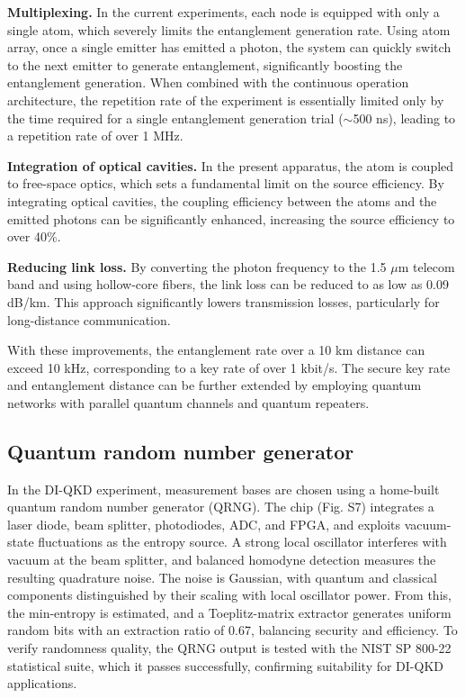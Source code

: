 \documentclass[aps,reprint,showpacs,superscriptaddress]{revtex4-2}
\begin{document}
\textbf{Multiplexing.} In the current experiments, each node is equipped with only a single atom, which severely limits the entanglement generation rate. Using atom array, once a single emitter has emitted a photon, the system can quickly switch to the next emitter to generate entanglement, significantly boosting the entanglement generation. When combined with the continuous operation architecture, the repetition rate of the experiment is essentially limited only by the time required for a single entanglement generation trial ($\sim$500 ns), leading to a repetition rate of over 1 MHz.

\textbf{Integration of optical cavities.} In the present apparatus, the atom is coupled to free-space optics, which sets a fundamental limit on the source efficiency. By integrating optical cavities, the coupling efficiency between the atoms and the emitted photons can be significantly enhanced, increasing the source efficiency to over 40\%.

\textbf{Reducing link loss.} By converting the photon frequency to the 1.5 $\mu$m telecom band and using hollow-core fibers, the link loss can be reduced to as low as 0.09 dB/km. This approach significantly lowers transmission losses, particularly for long-distance communication.

With these improvements, the entanglement rate over a 10 km distance can exceed 10 kHz, corresponding to a key rate of over 1 kbit/s. The secure key rate and entanglement distance can be further extended by employing quantum networks with parallel quantum channels and quantum repeaters.

\subsection{Quantum random number generator}
In the DI-QKD experiment, measurement bases are chosen using a home-built quantum random number generator (QRNG). The chip (Fig. S7) integrates a laser diode, beam splitter, photodiodes, ADC, and FPGA, and exploits vacuum-state fluctuations as the entropy source. A strong local oscillator interferes with vacuum at the beam splitter, and balanced homodyne detection measures the resulting quadrature noise. The noise is Gaussian, with quantum and classical components distinguished by their scaling with local oscillator power. From this, the min-entropy is estimated, and a Toeplitz-matrix extractor generates uniform random bits with an extraction ratio of 0.67, balancing security and efficiency. To verify randomness quality, the QRNG output is tested with the NIST SP 800-22 statistical suite, which it passes successfully, confirming suitability for DI-QKD applications.
\end{document}
